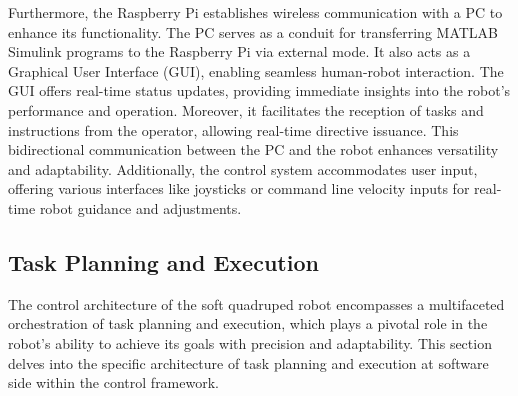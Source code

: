 Furthermore, the Raspberry Pi establishes wireless communication with a PC to enhance its functionality. The PC serves as a conduit for transferring MATLAB Simulink programs to the Raspberry Pi via external mode. It also acts as a Graphical User Interface (GUI), enabling seamless human-robot interaction. The GUI offers real-time status updates, providing immediate insights into the robot's performance and operation. Moreover, it facilitates the reception of tasks and instructions from the operator, allowing real-time directive issuance. This bidirectional communication between the PC and the robot enhances versatility and adaptability. Additionally, the control system accommodates user input, offering various interfaces like joysticks or command line velocity inputs for real-time robot guidance and adjustments.

\subsection{Task Planning and Execution}
The control architecture of the soft quadruped robot encompasses a multifaceted orchestration of task planning and execution, which plays a pivotal role in the robot's ability to achieve its goals with precision and adaptability. This section delves into the specific architecture of task planning and execution at software side within the control framework. 

